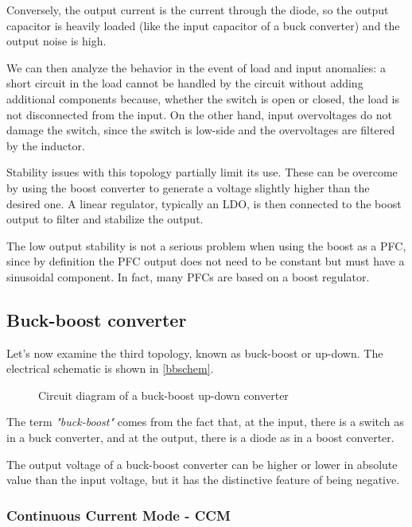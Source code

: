 \documentclass[../main.tex]{subfiles}
\begin{document}
Conversely, the output current is the current through the diode, so the output capacitor is heavily loaded (like the input capacitor of a buck converter) and the output noise is high.

We can then analyze the behavior in the event of load and input anomalies: a short circuit in the load cannot be handled by the circuit without adding additional components because, whether the switch is open or closed, the load is not disconnected from the input. On the other hand, input overvoltages do not damage the switch, since the switch is low-side and the overvoltages are filtered by the inductor.

Stability issues with this topology partially limit its use. These can be overcome by using the boost converter to generate a voltage slightly higher than the desired one. A linear regulator, typically an LDO, is then connected to the boost output to filter and stabilize the output.

The low output stability is not a serious problem when using the boost as a PFC, since by definition the PFC output does not need to be constant but must have a sinusoidal component. In fact, many PFCs are based on a boost regulator.


\subsection{Buck-boost converter}


Let's now examine the third topology, known as buck-boost or up-down. The electrical schematic is shown in \autoref{bbschem}.



\begin{figure}[h!]
\begin{center}


\label{bbschem}
\caption{Circuit diagram of a buck-boost up-down converter}	
\end{center}
\end{figure}


The term \textit{"buck-boost"} comes from the fact that, at the input, there is a switch as in a buck converter, and at the output, there is a diode as in a boost converter. 

The output voltage of a buck-boost converter can be higher or lower in absolute value than the input voltage, but it has the distinctive feature of being negative.

\subsubsection*{Continuous Current Mode - CCM}
\end{document}
